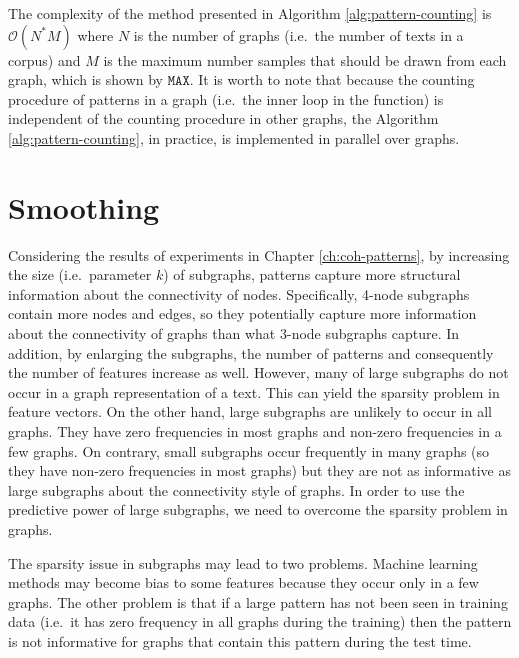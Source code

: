 The complexity of the method presented in Algorithm \ref{alg:pattern-counting} is $\mathcal{O}(N^ \ast M)$  where $N$ is the number of graphs (i.e.\ the number of texts in a corpus) and $M$ is the maximum number samples that should be drawn from each graph, which is shown by $\mathtt{MAX}$.
It is worth to note that because the counting procedure of patterns in a graph (i.e.\ the inner loop in the function) is independent of the counting procedure in other graphs, the Algorithm \ref{alg:pattern-counting}, in practice, is implemented in parallel over graphs. 
  
\section{Smoothing} 
\label{sec:lex-graph-smoothing}

Considering the results of experiments in Chapter \ref{ch:coh-patterns}, 
by increasing the size (i.e.\ parameter $k$) of subgraphs, patterns capture more
structural information about the connectivity of nodes. 
Specifically, 4-node subgraphs contain more nodes and edges, so they potentially capture more information about the connectivity of graphs than what 3-node subgraphs capture.  
In addition, by enlarging the subgraphs, the number of patterns and consequently the number of features increase as well.   
However, many of large subgraphs do not occur in a graph representation of a text. 
This can yield the sparsity problem in feature vectors. 
On the other hand, large subgraphs are unlikely to occur in all graphs. 
They have zero frequencies in most graphs and non-zero frequencies in a few graphs.  
On contrary, small subgraphs occur frequently in many graphs (so they have non-zero frequencies in most graphs) but
they are not as informative as large subgraphs about the
connectivity style of graphs. 
In order to use the predictive power of large subgraphs, we need to overcome the sparsity problem in graphs. 
  
The sparsity issue in subgraphs may lead to two problems. 
Machine learning methods may become bias to some features because they occur only in a few graphs. 
The other problem is that if a large pattern has not been seen in training data (i.e.\ it has zero frequency in all graphs during the training) then the pattern is not informative for graphs  that contain this pattern during the test time. 

